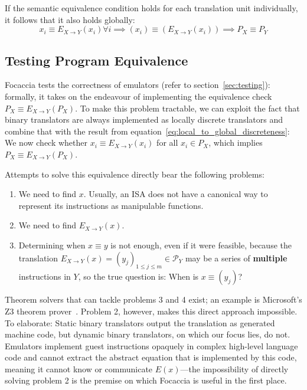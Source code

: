 If the semantic equivalence condition holds for each translation unit individually, it follows that it also holds globally:
\begin{equation}\label{eq:local_to_global_discreteness}
    x_i \equiv E_{X\rightarrow Y}(x_i) \forall i \implies (x_i) \equiv (E_{X\rightarrow Y}(x_i)) \implies P_X \equiv P_Y
\end{equation}

\subsection{Testing Program Equivalence}\label{sec:program_equiv}

Focaccia tests the correctness of emulators (refer to section~\ref{sec:testing}): formally, it takes on the endeavour of
implementing the equivalence check $P_X \equiv E_{X \rightarrow Y}(P_X)$. To make this problem tractable, we can exploit
the fact that binary translators are always implemented as locally discrete translators and combine that with the result
from equation~\ref{eq:local_to_global_discreteness}: We now check whether $x_i \equiv E_{X \rightarrow Y}(x_i)$ for all
$x_i \in P_X$, which implies $P_X \equiv E_{X \rightarrow Y}(P_X)$.

Attempts to solve this equivalence directly bear the following problems:

\begin{enumerate}
    \item We need to find $x$. Usually, an \ac{ISA} does not have a canonical way to represent its instructions as
        manipulable functions.
    \item We need to find $E_{X \rightarrow Y}(x)$.
    \item Determining when $x \equiv y$ is not enough, even if it were feasible, because the translation $E_{X
        \rightarrow Y}(x) = (y_j)_{1 \leq j \leq m} \in \mathcal{P}_Y$ may be a series of \textbf{multiple} instructions
        in $Y$, so the true question is: When is $x \equiv (y_j)$?
\end{enumerate}

Theorem solvers that can tackle problems 3 and 4 exist; an example is Microsoft's Z3 theorem
prover~\cite{Z3prover2024Mar}. Problem 2, however, makes this direct approach impossible. To elaborate: Static binary
translators output the translation as generated machine code, but dynamic binary translators, on which our focus lies,
do not. Emulators implement guest instructions opaquely in complex high-level language code and cannot extract the
abstract equation that is implemented by this code, meaning it cannot know or communicate $E(x)$---the impossibility of
directly solving problem 2 is the premise on which Focaccia is useful in the first place.

